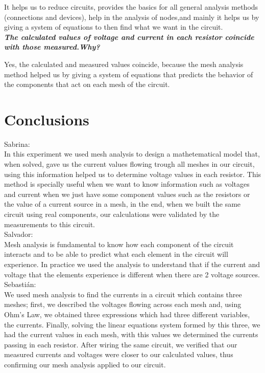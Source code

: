 \documentclass[letterpaper]{article}
\begin{document}
It helps us to reduce circuits, provides the basics for all general analysis methods (connections and devices), 
help in the analysis of nodes,and mainly it helps us by giving a system of equations to then find what we 
want in the circuit.\\
\textit{\textbf{The calculated values of voltage and current in each resistor coincide with those measured.Why?}}

Yes, the calculated and measured values coincide, because the mesh analysis method helped us by giving a system of equations that predicts the behavior of the components that act on each mesh of the circuit.
\section{Conclusions}
{\large Sabrina:}\\
In this experiment we used mesh analysis to design a mathetematical model that, when solved, gave us
the current values flowing trough all meshes in our circuit, using this information helped us to
determine voltage values in each resistor. This method is specially useful when we want to know
information such as voltages and current when we just have some component values such as the
resistors or the value of a current source in a mesh, in the end, when we built the same circuit
using real components, our calculations were validated by the measurements to this circuit. 
\\[2ex]
\newpage
{\large Salvador:}\\
Mesh analysis is fundamental to know how each component of the circuit interacts and to be able to predict 
what each element in the circuit will experience. In practice we used the analysis to understand that if 
the current and voltage that the elements experience is different when there are 2 voltage sources.
\\[2ex]
{\large Sebastián:}\\
We used mesh analysis to find the currents in a circuit which contains three meshes; first, we
described the voltages flowing across each mesh and, using Ohm's Law, we obtained three expressions
which had three different variables, the currents. Finally, solving the linear equations system
formed by this three, we had the current values in each mesh, with this values we determined the
currents passing in each resistor. After wiring the same circuit, we verified that our measured
currents and voltages were closer to our calculated values, thus confirming our mesh analysis
applied to our circuit.
\end{document}
